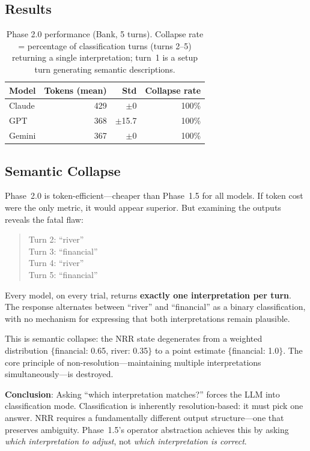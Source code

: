 \documentclass[11pt,a4paper]{article}
\begin{document}
\subsection{Results}

\begin{table}[ht]
\centering
\begin{tabular}{lrrr}
\toprule
\textbf{Model} & \textbf{Tokens (mean)} & \textbf{Std} & \textbf{Collapse rate} \\
\midrule
Claude & 429 & $\pm$0 & 100\% \\
GPT & 368 & $\pm$15.7 & 100\% \\
Gemini & 367 & $\pm$0 & 100\% \\
\bottomrule
\end{tabular}
\caption{Phase 2.0 performance (Bank, 5 turns). Collapse rate = percentage of
classification turns (turns 2--5) returning a single interpretation; turn~1 is a
setup turn generating semantic descriptions.}
\label{tab:phase2_0}
\end{table}

\subsection{Semantic Collapse}

Phase~2.0 is token-efficient---cheaper than Phase~1.5 for all models. If token
cost were the only metric, it would appear superior. But examining the outputs
reveals the fatal flaw:

\begin{quote}
Turn 2: ``river'' \\
Turn 3: ``financial'' \\
Turn 4: ``river'' \\
Turn 5: ``financial''
\end{quote}

Every model, on every trial, returns \textbf{exactly one interpretation per turn}.
The response alternates between ``river'' and ``financial'' as a binary
classification, with no mechanism for expressing that both interpretations remain
plausible.

This is semantic collapse: the NRR state degenerates from a weighted distribution
$\{$financial: 0.65, river: 0.35$\}$ to a point estimate $\{$financial: 1.0$\}$.
The core principle of non-resolution---maintaining multiple interpretations
simultaneously---is destroyed.

\textbf{Conclusion}: Asking ``which interpretation matches?'' forces the LLM into
classification mode. Classification is inherently resolution-based: it must pick
one answer. NRR requires a fundamentally different output structure---one that
preserves ambiguity. Phase~1.5's operator abstraction achieves this by asking
\textit{which interpretation to adjust}, not \textit{which interpretation is
correct}.
\end{document}
